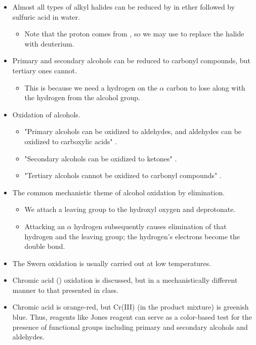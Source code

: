 \documentclass[../notes.tex]{subfiles}
\begin{document}
\begin{itemize}
    \item Almost all types of alkyl halides can be reduced by  in ether followed by sulfuric acid in water.
    \begin{itemize}
        \item Note that the proton comes from , so we may use  to replace the halide with deuterium.
    \end{itemize}
    \item Primary and secondary alcohols can be reduced to carbonyl compounds, but tertiary ones cannot.
    \begin{itemize}
        \item This is because we need a hydrogen on the $\alpha$ carbon to lose along with the hydrogen from the alcohol group.
    \end{itemize}
    \item Oxidation of alcohols.
    \begin{itemize}
        \item {}"Primary alcohols can be oxidized to aldehydes, and aldehydes can be oxidized to carboxylic acids" \parencite[542]{bib:SolomonsEtAl}.
        \item "Secondary alcohols can be oxidized to ketones" \parencite[542]{bib:SolomonsEtAl}.
        \item "Tertiary alcohols cannot be oxidized to carbonyl compounds" \parencite[542]{bib:SolomonsEtAl}.
    \end{itemize}
    \item The common mechanistic theme of alcohol oxidation by elimination.
    \begin{itemize}
        \item We attach a leaving group to the hydroxyl oxygen and deprotonate.
        \item Attacking an $\alpha$ hydrogen subsequently causes elimination of that hydrogen and the leaving group; the hydrogen's electrons become the double bond.
    \end{itemize}
    \item The Swern oxidation is usually carried out at low temperatures.
    \item Chromic acid () oxidation is discussed, but in a mechanistically different manner to that presented in class.
    \item Chromic acid is orange-red, but Cr(III) (in the product mixture) is greenish blue. Thus, reagents like Jones reagent can serve as a color-based test for the presence of functional groups including primary and secondary alcohols and aldehydes.

\end{itemize}
\end{document}
